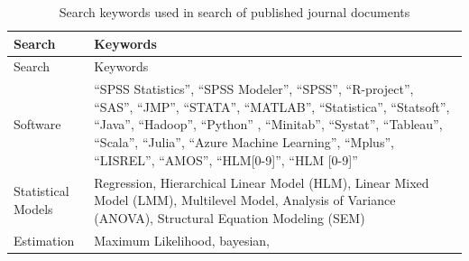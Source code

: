 \documentclass[english,man]{apa6}
\theoremstyle{definition}
\theoremstyle{definition}
\theoremstyle{remark}
\begin{document}
\begin{longtable}[]{@{}ll@{}}
\caption{\label{tab:searchwords} Search keywords used in search of published
journal documents}\tabularnewline
\toprule
\begin{minipage}[b]{0.21\columnwidth}\raggedright\strut
Search\strut
\end{minipage} & \begin{minipage}[b]{0.38\columnwidth}\raggedright\strut
Keywords\strut
\end{minipage}\tabularnewline
\midrule
\endfirsthead
\toprule
\begin{minipage}[b]{0.21\columnwidth}\raggedright\strut
Search\strut
\end{minipage} & \begin{minipage}[b]{0.38\columnwidth}\raggedright\strut
Keywords\strut
\end{minipage}\tabularnewline
\midrule
\endhead
\begin{minipage}[t]{0.21\columnwidth}\raggedright\strut
Software\strut
\end{minipage} & \begin{minipage}[t]{0.38\columnwidth}\raggedright\strut
\enquote{SPSS Statistics}, \enquote{SPSS Modeler}, \enquote{SPSS},
\enquote{R-project}, \enquote{SAS}, \enquote{JMP}, \enquote{STATA},
\enquote{MATLAB}, \enquote{Statistica}, \enquote{Statsoft},
\enquote{Java}, \enquote{Hadoop}, \enquote{Python} , \enquote{Minitab},
\enquote{Systat}, \enquote{Tableau}, \enquote{Scala}, \enquote{Julia},
\enquote{Azure Machine Learning}, \enquote{Mplus}, \enquote{LISREL},
\enquote{AMOS}, \enquote{HLM{[}0-9{]}}, \enquote{HLM {[}0-9{]}}\strut
\end{minipage}\tabularnewline
\begin{minipage}[t]{0.21\columnwidth}\raggedright\strut
Statistical Models\strut
\end{minipage} & \begin{minipage}[t]{0.38\columnwidth}\raggedright\strut
Regression, Hierarchical Linear Model (HLM), Linear Mixed Model (LMM),
Multilevel Model, Analysis of Variance (ANOVA), Structural Equation
Modeling (SEM)\strut
\end{minipage}\tabularnewline
\begin{minipage}[t]{0.21\columnwidth}\raggedright\strut
Estimation\strut
\end{minipage} & \begin{minipage}[t]{0.38\columnwidth}\raggedright\strut
Maximum Likelihood, bayesian,\strut
\end{minipage}\tabularnewline
\bottomrule
\end{longtable}
\end{document}
